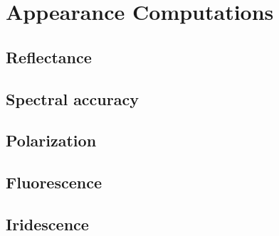 \chapter{Appearance Computations}

\section{Reflectance}

\section{Spectral accuracy}

\section{Polarization}

\section{Fluorescence}

\section{Iridescence}